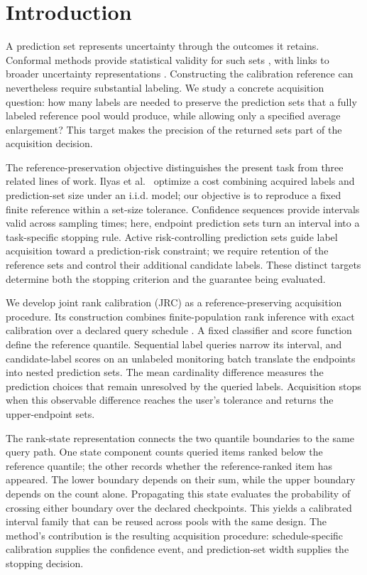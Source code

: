 \documentclass[preprint,12pt]{elsarticle}
\begin{document}
\section{Introduction}
A prediction set represents uncertainty through the outcomes it retains. Conformal methods provide statistical validity for such sets \cite{vovk,angelopoulos}, with links to broader uncertainty representations \cite{cella2022}. Constructing the calibration reference can nevertheless require substantial labeling. We study a concrete acquisition question: how many labels are needed to preserve the prediction sets that a fully labeled reference pool would produce, while allowing only a specified average enlargement? This target makes the precision of the returned sets part of the acquisition decision.

The reference-preservation objective distinguishes the present task from three related lines of work. Ilyas et al.\ \cite{ilyas} optimize a cost combining acquired labels and prediction-set size under an i.i.d. model; our objective is to reproduce a fixed finite reference within a set-size tolerance. Confidence sequences \cite{howard2021,howard2022,wor} provide intervals valid across sampling times; here, endpoint prediction sets turn an interval into a task-specific stopping rule. Active risk-controlling prediction sets \cite{active2024} guide label acquisition toward a prediction-risk constraint; we require retention of the reference sets and control their additional candidate labels. These distinct targets determine both the stopping criterion and the guarantee being evaluated.

We develop joint rank calibration (JRC) as a reference-preserving acquisition procedure. Its construction combines finite-population rank inference with exact calibration over a declared query schedule \cite{cochran,jin}. A fixed classifier and score function define the reference quantile. Sequential label queries narrow its interval, and candidate-label scores on an unlabeled monitoring batch translate the endpoints into nested prediction sets. The mean cardinality difference measures the prediction choices that remain unresolved by the queried labels. Acquisition stops when this observable difference reaches the user's tolerance and returns the upper-endpoint sets.

The rank-state representation connects the two quantile boundaries to the same query path. One state component counts queried items ranked below the reference quantile; the other records whether the reference-ranked item has appeared. The lower boundary depends on their sum, while the upper boundary depends on the count alone. Propagating this state evaluates the probability of crossing either boundary over the declared checkpoints. This yields a calibrated interval family that can be reused across pools with the same design. The method's contribution is the resulting acquisition procedure: schedule-specific calibration supplies the confidence event, and prediction-set width supplies the stopping decision.
\end{document}
